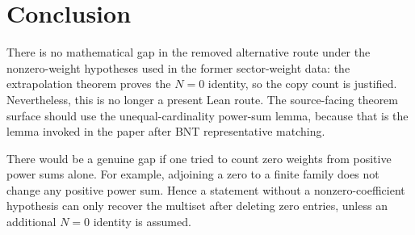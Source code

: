 \documentclass{article}
\begin{document}
\section{Conclusion}

There is no mathematical gap in the removed alternative route under the
nonzero-weight hypotheses used in the former sector-weight data: the
extrapolation theorem proves the $N=0$ identity, so the copy count is
justified. Nevertheless, this is no longer a present Lean route. The
source-facing theorem surface should use the unequal-cardinality power-sum
lemma, because that is the lemma invoked in the paper after BNT representative
matching.

There would be a genuine gap if one tried to count zero weights from positive
power sums alone. For example, adjoining a zero to a finite family does not
change any positive power sum. Hence a statement without a nonzero-coefficient
hypothesis can only recover the multiset after deleting zero entries, unless an
additional $N=0$ identity is assumed.



\end{document}

